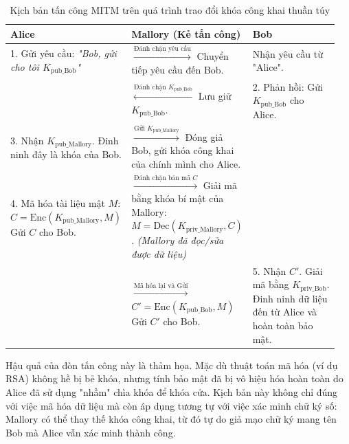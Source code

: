\begin{table}[htbp]
    \centering
    \caption{Kịch bản tấn công MITM trên quá trình trao đổi khóa công khai thuần túy}
    \label{tab:mitm}
    \renewcommand{\arraystretch}{1.5}
    \begin{tabular}{|p{0.3\linewidth}|p{0.35\linewidth}|p{0.3\linewidth}|}
        \hline
        \rowcolor{gray!20} 
        \textbf{Alice} & \textbf{Mallory (Kẻ tấn công)} & \textbf{Bob} \\ \hline
        1. Gửi yêu cầu: \textit{"Bob, gửi cho tôi $K_{\mathrm{pub\_Bob}}$"} & $\xrightarrow{\text{Đánh chặn yêu cầu}}$ \newline Chuyển tiếp yêu cầu đến Bob. & Nhận yêu cầu từ "Alice". \\ \hline
        & $\xleftarrow{\text{Đánh chặn } K_{\mathrm{pub\_Bob}}}$ \newline Lưu giữ $K_{\mathrm{pub\_Bob}}$. & 2. Phản hồi: Gửi $K_{\mathrm{pub\_Bob}}$ cho Alice. \\ \hline
        3. Nhận $K_{\mathrm{pub\_Mallory}}$. Đinh ninh đây là khóa của Bob. & $\xrightarrow{\text{Gửi } K_{\mathrm{pub\_Mallory}}}$ \newline Đóng giả Bob, gửi khóa công khai của chính mình cho Alice. & \\ \hline
        4. Mã hóa tài liệu mật $M$: \newline $C = \mathrm{Enc}(K_{\mathrm{pub\_Mallory}}, M)$ \newline Gửi $C$ cho Bob. & $\xrightarrow{\text{Đánh chặn bản mã } C}$ \newline Giải mã bằng khóa bí mật của Mallory: $M = \mathrm{Dec}(K_{\mathrm{priv\_Mallory}}, C)$. \newline \textit{(Mallory đã đọc/sửa được dữ liệu)} & \\ \hline
        & $\xrightarrow{\text{Mã hóa lại và Gửi}}$ \newline $C' = \mathrm{Enc}(K_{\mathrm{pub\_Bob}}, M)$ \newline Gửi $C'$ cho Bob. & 5. Nhận $C'$. \newline Giải mã bằng $K_{\mathrm{priv\_Bob}}$. \newline Đinh ninh dữ liệu đến từ Alice và hoàn toàn bảo mật. \\ \hline
    \end{tabular}
\end{table}

Hậu quả của đòn tấn công này là thảm họa. Mặc dù thuật toán mã hóa (ví dụ RSA) không hề bị bẻ khóa, nhưng tính bảo mật đã bị vô hiệu hóa hoàn toàn do Alice đã sử dụng "nhầm" chìa khóa để khóa cửa. Kịch bản này không chỉ đúng với việc mã hóa dữ liệu mà còn áp dụng tương tự với việc xác minh chữ ký số: Mallory có thể thay thế khóa công khai, từ đó tự do giả mạo chữ ký mang tên Bob mà Alice vẫn xác minh thành công.

